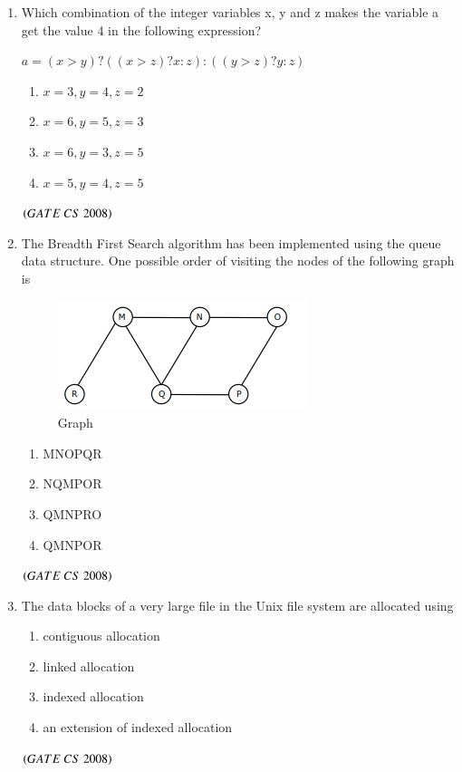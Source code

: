 \documentclass[journal, onecolumn]{IEEEtran}
\numberwithin{equation}{enumi}
\numberwithin{figure}{enumi}
\begin{document}
\begin{enumerate}
\item Which combination of the integer variables x, y and z makes the variable a get the value 4 in the following expression? 
    
$a = (x>y)?((x>z)?x:z):((y>z)?y:z)$
\vspace{-1em}%
\begin{multicols}{2}
\begin{enumerate}
   \item $x=3,y=4,z=2$
   \item $x=6,y=5,z=3$
   \item $x=6,y=3,z=5$
   \item $x=5,y=4,z=5$
\end{enumerate}
\end{multicols}
\hfill $\left(GATE\ CS\  2008\right)$

\item The Breadth First Search algorithm has been implemented using the queue data structure. One possible order of visiting the nodes of the following graph is
\begin{figure}[H]
\centering
\includegraphics[width=0.5\columnwidth]{figs/fig3.png}
\caption{Graph}
\label{fig:3}
\end{figure}
\vspace{-0.5em}%
\begin{multicols}{4}
\begin{enumerate}
    \item  MNOPQR
    \item NQMPOR
    \item QMNPRO
    \item  QMNPOR
\end{enumerate}
\end{multicols}
\hfill $\left(GATE\ CS\  2008\right)$

\item The data blocks of a very large file in the Unix file system are allocated using
\begin{enumerate}
    \item contiguous allocation
    \item  linked allocation 
    \item indexed allocation 
    \item an extension of indexed allocation 
\end{enumerate}
\hfill $\left(GATE\ CS\  2008\right)$
\bigskip


\end{enumerate}
\end{document}
